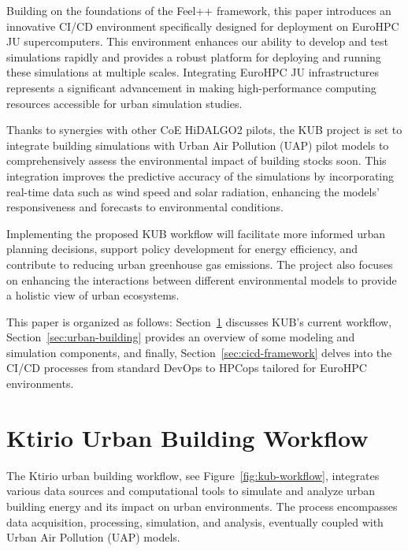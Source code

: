 \documentclass[runningheads]{llncs}
\begin{document}
Building on the foundations of the Feel++ framework, this paper introduces an innovative CI/CD environment specifically designed for deployment on EuroHPC JU supercomputers. This environment enhances our ability to develop and test simulations rapidly and provides a robust platform for deploying and running these simulations at multiple scales. Integrating EuroHPC JU infrastructures represents a significant advancement in making high-performance computing resources accessible for urban simulation studies.

Thanks to synergies with other CoE HiDALGO2 pilots, the KUB project is set to integrate building simulations with Urban Air Pollution (UAP) pilot models to comprehensively assess the environmental impact of building stocks soon. This integration improves the predictive accuracy of the simulations by incorporating real-time data such as wind speed and solar radiation, enhancing the models' responsiveness and forecasts to environmental conditions.

Implementing the proposed KUB workflow will facilitate more informed urban planning decisions, support policy development for energy efficiency, and contribute to reducing urban greenhouse gas emissions. The project also focuses on enhancing the interactions between different environmental models to provide a holistic view of urban ecosystems.

This paper is organized as follows: Section~\ref{sec:kub-workflow} discusses KUB's current workflow, Section~\ref{sec:urban-building} provides an overview of some modeling and simulation components, and finally, Section~\ref{sec:cicd-framework} delves into the CI/CD processes from standard DevOps to HPCops tailored for EuroHPC environments.


\section{Ktirio Urban Building Workflow}
\label{sec:kub-workflow}

The Ktirio urban building workflow, see Figure~\ref{fig:kub-workflow}, integrates various data sources and computational tools to simulate and analyze urban building energy and its impact on urban environments. The process encompasses data acquisition, processing, simulation, and analysis, eventually coupled with Urban Air Pollution (UAP) models.
\end{document}

